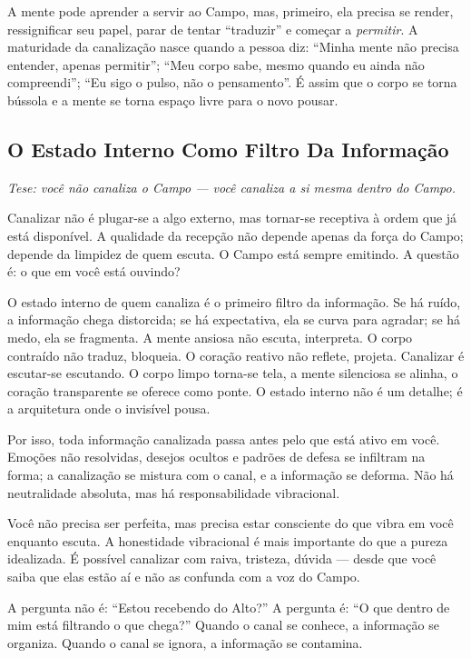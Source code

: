\documentclass[12pt]{book}
\begin{document}
A mente pode aprender a servir ao Campo, mas, primeiro, ela precisa se render, ressignificar seu papel, parar de tentar ``traduzir'' e começar a \textit{permitir}. A maturidade da canalização nasce quando a pessoa diz: ``Minha mente não precisa entender, apenas permitir''; ``Meu corpo sabe, mesmo quando eu ainda não compreendi''; ``Eu sigo o pulso, não o pensamento''. É assim que o corpo se torna bússola e a mente se torna espaço livre para o novo pousar.

\subsection*{O Estado Interno Como Filtro Da Informação}

\textit{Tese: você não canaliza o Campo --- você canaliza a si mesma dentro do Campo.}

Canalizar não é plugar-se a algo externo, mas tornar-se receptiva à ordem que já está disponível. A qualidade da recepção não depende apenas da força do Campo; depende da limpidez de quem escuta. O Campo está sempre emitindo. A questão é: o que em você está ouvindo?

O estado interno de quem canaliza é o primeiro filtro da informação. Se há ruído, a informação chega distorcida; se há expectativa, ela se curva para agradar; se há medo, ela se fragmenta. A mente ansiosa não escuta, interpreta. O corpo contraído não traduz, bloqueia. O coração reativo não reflete, projeta. Canalizar é escutar-se escutando. O corpo limpo torna-se tela, a mente silenciosa se alinha, o coração transparente se oferece como ponte. O estado interno não é um detalhe; é a arquitetura onde o invisível pousa.

Por isso, toda informação canalizada passa antes pelo que está ativo em você. Emoções não resolvidas, desejos ocultos e padrões de defesa se infiltram na forma; a canalização se mistura com o canal, e a informação se deforma. Não há neutralidade absoluta, mas há responsabilidade vibracional.

Você não precisa ser perfeita, mas precisa estar consciente do que vibra em você enquanto escuta. A honestidade vibracional é mais importante do que a pureza idealizada. É possível canalizar com raiva, tristeza, dúvida --- desde que você saiba que elas estão aí e não as confunda com a voz do Campo.

A pergunta não é: ``Estou recebendo do Alto?'' A pergunta é: ``O que dentro de mim está filtrando o que chega?'' Quando o canal se conhece, a informação se organiza. Quando o canal se ignora, a informação se contamina.
\end{document}
